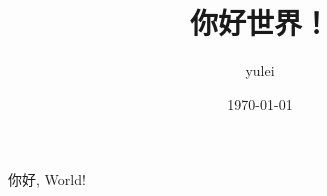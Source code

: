 \documentclass[UTF-8]{ctexart}
\title{你好世界！}
\author{yulei}
\date{\today}
\begin{document}
\maketitle
你好, World!
\end{document}

